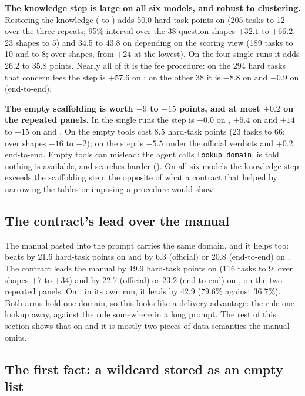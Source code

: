 \textbf{The knowledge step is large on all six models, and robust to
clustering.} Restoring the knowledge (\armH{} to \armC{}) adds 50.0
hard-task points on \mSol{} (205 tasks to 12 over the three repeats; 95\%
interval over the 38 question shapes $+32.1$ to $+66.2$, 23 shapes to 5)
and 34.5 to 43.8 on \mQwen{} depending on the scoring view (189 tasks to
10 and to 8; over shapes, from $+24$ at the lowest). On the four single
runs it adds 26.2 to 35.8 points. Nearly all of it is the fee procedure:
on the 294 hard tasks that concern fees the step is $+57.6$ on \mSol{}; on
the other 38 it is $-8.8$ on \mSol{} and $-0.9$ on \mQwen{} (end-to-end).

\textbf{The empty scaffolding is worth $-9$ to $+15$ points, and at most
$+0.2$ on the repeated panels.} In the single runs the step is $+0.0$ on
\mDS{}, $+5.4$ on \mGLM{} and $+14$ to $+15$ on \mSON{} and \mGPT{}. On
\mSol{} the empty tools cost 8.5 hard-task points (23 tasks to 66; over
shapes $-16$ to $-2$); on \mQwen{} the step is $-5.5$ under the official
verdicts and $+0.2$ end-to-end. Empty tools can mislead: the agent calls
\texttt{lookup\_domain}, is told nothing is available, and searches harder
(). On all six models the knowledge step exceeds
the scaffolding step, the opposite of what a contract that helped by
narrowing the tables or imposing a procedure would show.

\subsection{The contract's lead over the manual}
\label{sec:panel-gaps}

The manual pasted into the prompt carries the same domain, and it helps
too: \armM{} beats \armS{} by 21.6 hard-task points on \mSol{} and by 6.3
(official) or 20.8 (end-to-end) on \mQwen{}. The contract leads the manual
by 19.9 hard-task points on \mSol{} (116 tasks to 9; over shapes $+7$ to
$+34$) and by 22.7 (official) or 23.2 (end-to-end) on \mQwen{}, on the two
repeated panels. On \mLuna{}, in its own run, it leads by 42.9 (79.6\%
against 36.7\%). Both arms hold one domain, so this looks like a delivery
advantage: the rule one lookup away, against the rule somewhere in a long
prompt. The rest of this section shows that on \mLuna{} and \mQwen{} it is
mostly two pieces of data semantics the manual omits.

\subsection{The first fact: a wildcard stored as an empty list}
\label{sec:one-fact}
\label{sec:interpretation}

